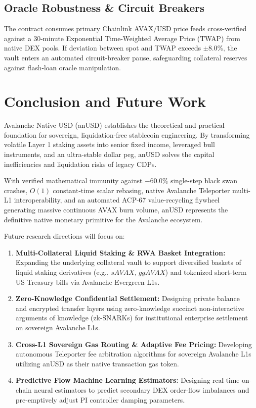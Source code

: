 \documentclass[11pt,a4paper]{article}
\begin{document}
\subsection{Oracle Robustness \& Circuit Breakers}
The  contract consumes primary Chainlink AVAX/USD price feeds cross-verified against a 30-minute Exponential Time-Weighted Average Price (TWAP) from native DEX pools. If deviation between spot and TWAP exceeds $\pm 8.0\%$, the vault enters an automated circuit-breaker pause, safeguarding collateral reserves against flash-loan oracle manipulation.

\section{Conclusion and Future Work}

Avalanche Native USD (anUSD) establishes the theoretical and practical foundation for sovereign, liquidation-free stablecoin engineering. By transforming volatile Layer 1 staking assets into senior fixed income, leveraged bull instruments, and an ultra-stable dollar peg, anUSD solves the capital inefficiencies and liquidation risks of legacy CDPs. 

With verified mathematical immunity against $-60.0\%$ single-step black swan crashes, $O(1)$ constant-time scalar rebasing, native Avalanche Teleporter multi-L1 interoperability, and an automated ACP-67 value-recycling flywheel generating massive continuous AVAX burn volume, anUSD represents the definitive native monetary primitive for the Avalanche ecosystem.

Future research directions will focus on:
\begin{enumerate}
    \item \textbf{Multi-Collateral Liquid Staking \& RWA Basket Integration:} Expanding the underlying collateral vault to support diversified baskets of liquid staking derivatives (e.g., $sAVAX$, $ggAVAX$) and tokenized short-term US Treasury bills via Avalanche Evergreen L1s.
    \item \textbf{Zero-Knowledge Confidential Settlement:} Designing private balance and encrypted transfer layers using zero-knowledge succinct non-interactive arguments of knowledge (zk-SNARKs) for institutional enterprise settlement on sovereign Avalanche L1s.
    \item \textbf{Cross-L1 Sovereign Gas Routing \& Adaptive Fee Pricing:} Developing autonomous Teleporter fee arbitration algorithms for sovereign Avalanche L1s utilizing anUSD as their native transaction gas token.
    \item \textbf{Predictive Flow Machine Learning Estimators:} Designing real-time on-chain neural estimators to predict secondary DEX order-flow imbalances and pre-emptively adjust PI controller damping parameters.
\end{enumerate}
\end{document}

